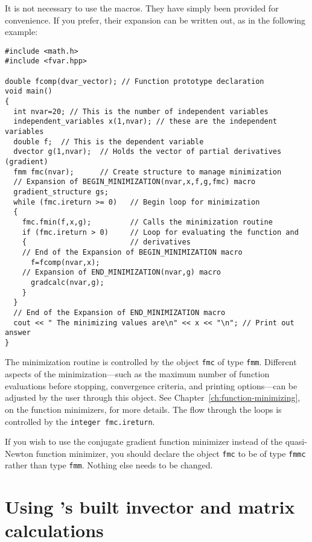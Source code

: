\documentclass{admbmanual}
\begin{document}
It is not necessary to use the macros. They have simply been provided for
convenience. If you prefer, their expansion can be written out, as in the
following example:
\begin{lstlisting}
#include <math.h>
#include <fvar.hpp>

double fcomp(dvar_vector); // Function prototype declaration
void main()
{
  int nvar=20; // This is the number of independent variables
  independent_variables x(1,nvar); // these are the independent variables
  double f;  // This is the dependent variable
  dvector g(1,nvar);  // Holds the vector of partial derivatives (gradient)
  fmm fmc(nvar);      // Create structure to manage minimization
  // Expansion of BEGIN_MINIMIZATION(nvar,x,f,g,fmc) macro
  gradient_structure gs;
  while (fmc.ireturn >= 0)   // Begin loop for minimization
  {
    fmc.fmin(f,x,g);         // Calls the minimization routine
    if (fmc.ireturn > 0)     // Loop for evaluating the function and
    {                        // derivatives
    // End of the Expansion of BEGIN_MINIMIZATION macro
      f=fcomp(nvar,x);
    // Expansion of END_MINIMIZATION(nvar,g) macro
      gradcalc(nvar,g);
    }
  }
  // End of the Expansion of END_MINIMIZATION macro
  cout << " The minimizing values are\n" << x << "\n"; // Print out answer
}
\end{lstlisting}

The minimization routine is controlled by the object \texttt{fmc} of type
\texttt{fmm}. Different aspects of the minimization---such as the maximum number
of function evaluations before stopping, convergence criteria, and printing
options---can be adjusted by the user through this object. See
Chapter~\ref{ch:function-minimizing}, on the function minimizers, for more
details. The flow through the loops is controlled by the
\texttt{integer fmc.ireturn}.

If you wish to use the conjugate gradient function minimizer instead of the
quasi-Newton function minimizer, you should declare the object \texttt{fmc} to
be of type \texttt{fmmc} rather than type \texttt{fmm}. Nothing else needs to be
changed.

\section{Using \scAD's built in\br vector and matrix calculations}
\end{document}
